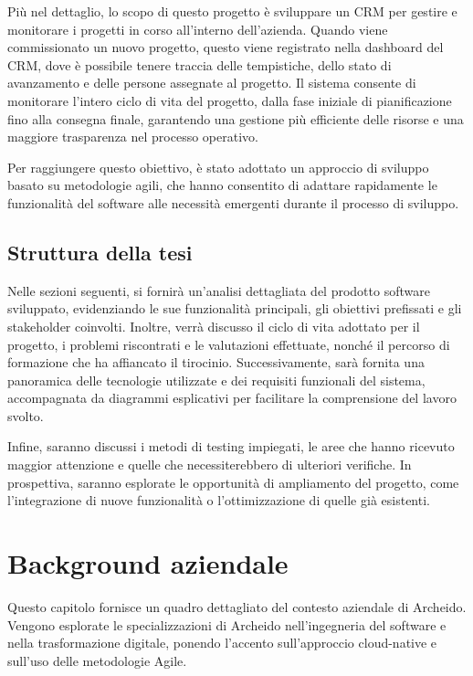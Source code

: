 \documentclass[target=bach,aauheader=,style=]{thud}
\begin{document}
\noindent  Più nel dettaglio, lo scopo di questo progetto è sviluppare un CRM per gestire e monitorare i progetti in corso all'interno dell'azienda. Quando viene commissionato un nuovo progetto, questo viene registrato nella dashboard del CRM, dove è possibile tenere traccia delle tempistiche, dello stato di avanzamento e delle persone assegnate al progetto. Il sistema consente di monitorare l'intero ciclo di vita del progetto, dalla fase iniziale di pianificazione fino alla consegna finale, garantendo una gestione più efficiente delle risorse e una maggiore trasparenza nel processo operativo.

\noindent Per raggiungere questo obiettivo, è stato adottato un approccio di sviluppo basato su metodologie agili, che hanno consentito di adattare rapidamente le funzionalità del software alle necessità emergenti durante il processo di sviluppo.


\section{Struttura della tesi}

Nelle sezioni seguenti, si fornirà un'analisi dettagliata del prodotto software sviluppato, evidenziando le sue funzionalità principali, gli obiettivi prefissati e gli stakeholder coinvolti. Inoltre, verrà discusso il ciclo di vita adottato per il progetto, i problemi riscontrati e le valutazioni effettuate, nonché il percorso di formazione che ha affiancato il tirocinio. Successivamente, sarà fornita una panoramica delle tecnologie utilizzate e dei requisiti funzionali del sistema, accompagnata da diagrammi esplicativi per facilitare la comprensione del lavoro svolto. 

\noindent Infine, saranno discussi i metodi di testing impiegati, le aree che hanno ricevuto maggior attenzione e quelle che necessiterebbero di ulteriori verifiche. In prospettiva, saranno esplorate le opportunità di ampliamento del progetto, come l'integrazione di nuove funzionalità o l'ottimizzazione di quelle già esistenti. 

\chapter{Background aziendale}
Questo capitolo fornisce un quadro dettagliato del contesto aziendale di Archeido. Vengono esplorate le specializzazioni di Archeido nell'ingegneria del software e nella trasformazione digitale, ponendo l'accento sull'approccio cloud-native e sull'uso delle metodologie Agile.
\end{document}
